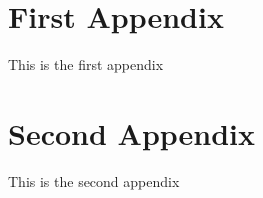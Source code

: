 \appendix

\section{First Appendix}

This is the first appendix

\section{Second Appendix}

This is the second appendix
